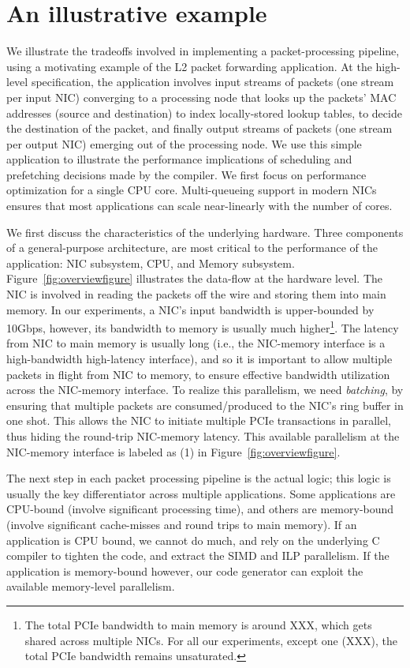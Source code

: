 \section{An illustrative example}
\label{Buildingblocks}
We illustrate the tradeoffs involved in implementing a packet-processing
pipeline, using a motivating example of the L2 packet forwarding application.
At the high-level specification, the application involves input streams
of packets (one stream per input NIC) converging
to a processing node that looks up the packets' MAC addresses (source
and destination)
to index locally-stored lookup tables, to decide the destination of the packet, and
finally output streams of packets (one stream per output NIC) emerging out of
the processing node. We use
this simple application to illustrate the performance implications of
scheduling and prefetching decisions made by the compiler. We first focus on performance
optimization for a single CPU core. Multi-queueing support in modern NICs
ensures that most applications can scale near-linearly with the number of cores.

We first discuss the characteristics of the underlying hardware.
Three components of a general-purpose architecture, are most critical to the performance of the
application: NIC subsystem, CPU, and Memory subsystem. Figure~\ref{fig:overviewfigure}
illustrates the data-flow at the hardware level. The NIC is involved in reading the packets
off the wire and storing them into main memory. In our experiments, a NIC's input bandwidth
is upper-bounded by 10Gbps, however, its bandwidth to memory is usually much higher\footnote{The
total PCIe bandwidth to main memory is around XXX, which gets shared across multiple NICs. For
all our experiments, except one (XXX), the total PCIe bandwidth remains unsaturated.}. The latency
from NIC to main memory is usually long (i.e., the NIC-memory interface is a high-bandwidth
high-latency interface), and so it is important to allow multiple
packets in flight from NIC to memory, to ensure effective bandwidth utilization across the
NIC-memory interface. To realize this parallelism, we need {\em batching}, by ensuring
that multiple
packets are consumed/produced to the NIC's ring buffer in one shot. This allows the NIC to initiate
multiple PCIe transactions in parallel, thus hiding the round-trip NIC-memory latency. This
available parallelism at the NIC-memory interface is labeled as (1) %
in Figure~\ref{fig:overviewfigure}.

The next step in each packet processing pipeline is the actual logic; this logic is usually
the key differentiator across multiple applications. Some applications are CPU-bound (involve
significant processing time), and others are memory-bound (involve significant cache-misses
and round trips to main memory). If an application is CPU bound, we cannot do much, and rely
on the underlying C compiler to tighten the code, and extract the SIMD and ILP parallelism. If
the application is memory-bound however, our code generator can exploit the
available memory-level parallelism.

